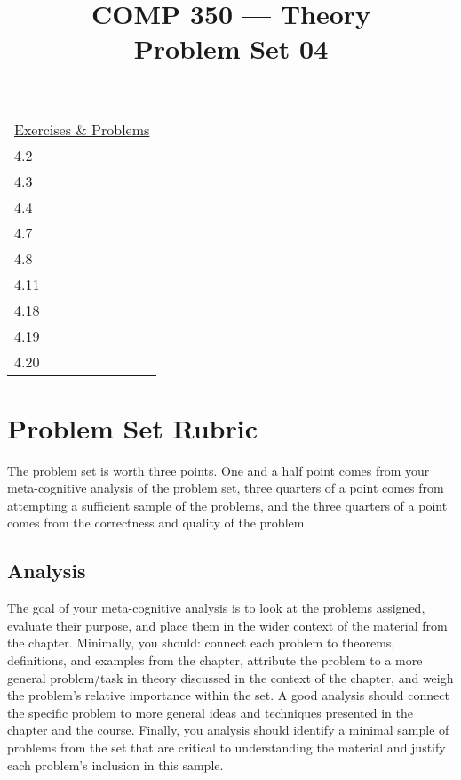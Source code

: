 \documentclass[nobib]{tufte-handout}
\title{COMP 350 --- Theory \\ Problem Set 04}
\begin{document}
\maketitle

\begin{center}
\begin{tabular}{l}
  \underline{Exercises \& Problems} \\
    4.2 \\ %
    4.3 \\
    4.4 \\
    4.7 \\ %
    4.8 \\ %
    4.11 \\ %
    4.18 \\
    4.19 \\
    4.20 \\
\end{tabular}
\end{center}


\section*{Problem Set Rubric}

The problem set is worth three points.  One and a half point comes from your meta-cognitive analysis of the problem set, three quarters of a point comes from attempting a sufficient sample of the problems, and the three quarters of a point comes from the correctness and quality of the problem.

\subsection*{Analysis}

The goal of your meta-cognitive analysis is to look at the problems assigned, evaluate their purpose, and place them in the wider context of the material from the chapter. Minimally, you should: connect each problem to theorems, definitions, and examples from the chapter, attribute the problem to a more general problem/task in theory discussed in the context of the chapter, and weigh the problem's relative importance within the set. A good analysis should connect the specific problem to more general ideas and techniques presented in the chapter and the course. Finally, you analysis should identify a minimal sample of problems from the set that are critical to understanding the material and justify each problem's inclusion in this sample.
\end{document}
